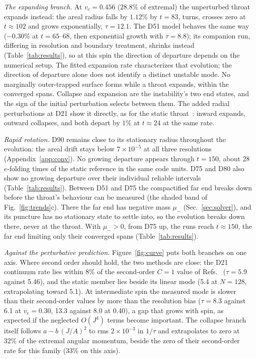 \documentclass[twocolumn,floatfix,aps,prd,superscriptaddress,nofootinbib]{revtex4-2}
\begin{document}
\emph{The expanding branch.} At $v_e=0.456$ ($28.8\%$ of extremal) the unperturbed throat expands instead: the areal radius falls by $1.12\%$ by $t=83$, turns, crosses zero at $t\approx102$ and grows exponentially, $\tau=12.1$. The D51 model behaves the same way ($-0.30\%$ at $t=65$--68, then exponential growth with $\tau=8.8$); its companion run, differing in resolution and boundary treatment, shrinks instead (Table~\ref{tab:results}), so at this spin the direction of departure depends on the numerical setup. The fitted expansion rate characterizes that evolution; the direction of departure alone does not identify a distinct unstable mode. No marginally outer-trapped surface forms while a throat expands, within the converged spans. Collapse and expansion are the instability's two end states, and the sign of the initial perturbation selects between them. The added radial perturbations at D21 show it directly, as for the static throat~\cite{shirokov2026c}: inward expands, outward collapses, and both depart by $1\%$ at $t\approx24$ at the same rate.

\emph{Rapid rotation.} D90 remains close to its stationary radius throughout the evolution: the areal drift stays below $7\times10^{-5}$ at all three resolutions (Appendix~\ref{app:conv}). No growing departure appears through $t=150$, about 28 $e$-folding times of the static reference in the same code units. D75 and D80 also show no growing departure over their individual reliable intervals (Table~\ref{tab:results}). Between D51 and D75 the compactified far end breaks down before the throat's behaviour can be measured (the shaded band of Fig.~\ref{fig:trends}c). There the far end has negative mass $\mu_-$ (Sec.~\ref{sec:solver}), and its puncture has no stationary state to settle into, so the evolution breaks down there, never at the throat. With $\mu_->0$, from D75 up, the runs reach $t\approx150$, the far end limiting only their converged spans (Table~\ref{tab:results}).

\emph{Against the perturbative prediction.} Figure~\ref{fig:curve} puts both branches on one axis. Where second order should hold, the two methods are close: the D21 continuum rate lies within $8\%$ of the second-order $C=1$ value of Refs.~\cite{azad2023,azad2024} ($\tau=5.9$ against 5.46), and the static member lies beside its linear mode (5.4 at $N=128$, extrapolating toward 5.1). At intermediate spin the measured mode is slower than their second-order values by more than the resolution bias ($\tau=8.3$ against 6.1 at $v_e=0.30$, 13.3 against 8.0 at 0.40), a gap that grows with spin, as expected if the neglected $O(J^4)$ terms become important. The collapse branch itself follows $a-b\,(J/A)^2$ to rms $2\times10^{-3}$ in $1/\tau$ and extrapolates to zero at $32\%$ of the extremal angular momentum, beside the zero of their second-order rate for this family ($33\%$ on this axis).
\end{document}
